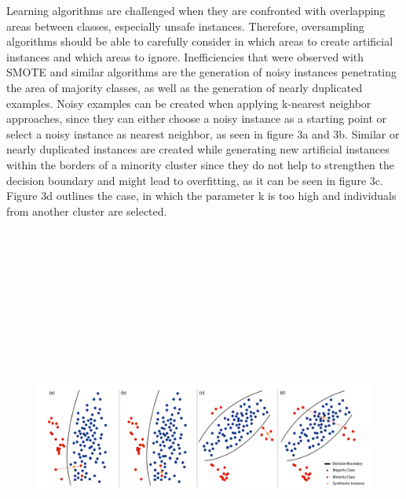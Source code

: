 \documentclass[parskip=full]{scrartcl}
\begin{document}
Learning algorithms are challenged when they are confronted with overlapping
areas between classes, especially unsafe instances. Therefore, oversampling
algorithms should be able to carefully consider in which areas to create
artificial instances and which areas to ignore. Inefficiencies that were
observed with SMOTE and similar algorithms are the generation of noisy instances
penetrating the area of majority classes, as well as the generation of nearly
duplicated examples. Noisy examples can be created when applying k-nearest
neighbor approaches, since they can either choose a noisy instance as a starting
point or select a noisy instance as nearest neighbor, as seen in figure 3a and
3b. Similar or nearly duplicated instances are created while generating new
artificial instances within the borders of a minority cluster since they do not
help to strengthen the decision boundary and might lead to overfitting, as it
can be seen in figure 3c. Figure 3d outlines the case, in which the parameter k
is too high and individuals from another cluster are selected.

\begin{figure}[H]
	\centering
	\includegraphics[width=16.5cm, height=14cm, keepaspectratio]{./resources/fig3.png}
\end{figure}
\end{document}
